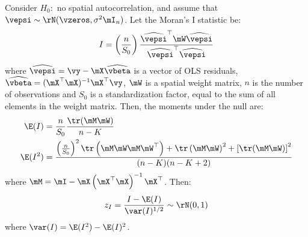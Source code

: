 \documentclass[english,12pt]{book}\usepackage[]{graphicx}\usepackage[]{xcolor}
\begin{document}
\begin{theorem}[Moran's $I$]\label{teo:Moran-for-residuals}
Consider $H_0:$ no spatial autocorrelation, and assume that $\vepsi \sim \rN(\vzeros, \sigma^2\mI_n)$. Let the Moran's I statistic be:
\begin{equation}\label{eq:I_Moran_res_1}
I = \left(\frac{n}{S_0}\right)\frac{\widehat{\vepsi}^\top \mW\widehat{\vepsi}}{\widehat{\vepsi}^\top\widehat{\vepsi}}
\end{equation}
where $\widehat{\vepsi} = \vy - \mX\widehat{\vbeta}$ is a vector of OLS residuals, $\widehat{\vbeta} = (\mX^\top\mX)^{-1}\mX^\top\vy$,  $\mW$ is a spatial weight matrix, $n$ is the number of observations and $S_0$ is a standardization factor, equal to the sum of all elements in the weight matrix. Then, the moments under the null are:
\begin{equation}
\begin{aligned}
  \E(I)   & = \frac{n}{S_0}\frac{\tr(\mM\mW)}{n - K} \\
  \E(I^2) & = \frac{\left(\frac{n}{S_0}\right)^2\tr\left(\mM\mW\mM\mW^\top\right) + \tr\left(\mM\mW\right)^2 + \left[\tr(\mM\mW)\right]^2}{(n -K)(n-K+2)}
\end{aligned}
\end{equation}
%
where $\mM = \mI- \mX\left(\mX^\top\mX\right)^{-1}\mX^\top$. Then:
\begin{equation}
z_I = \frac{I - \E(I)}{\var(I)^{1/2}}\sim \rN(0, 1)
\end{equation}
%
where $\var(I) = \E(I^2) - \E(I)^2$. 
\end{theorem}



\end{document}
